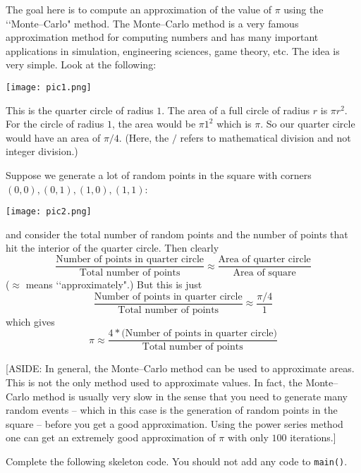 The goal here is to compute an approximation of the value of $\pi$ using the
\lq\lq Monte--Carlo" method. The Monte--Carlo method is a very famous
approximation method for computing numbers and has many important applications
in simulation, engineering sciences, game theory, etc. The idea is very simple.
Look at the following:
\begin{center}
\texttt{[image: pic1.png]}
\end{center}
This is the quarter circle of radius $1$. The area of a full circle of radius
$r$ is $\pi r^2$. For the circle of radius $1$, the area would be $\pi 1^2$
which is $\pi$. So our quarter circle would have an area of $\pi / 4$. (Here,
the $/$ refers to mathematical division and not integer division.)

Suppose we generate a lot of random points in the square with corners
$(0,0), (0,1), (1,0), (1,1)$:
\begin{center}
\texttt{[image: pic2.png]}
\end{center}

and consider the total number of random points and the number of points that
hit the interior of the quarter circle. Then clearly
\[
\frac{\text{Number of points in quarter circle}}
{\text{Total number of points}} 
\approx
\frac{\text{Area of quarter circle}}
{\text{Area of square}}
\]
($\approx$ means \lq\lq approximately".) But this is just
\[
\frac{\text{Number of points in quarter circle}}
{\text{Total number of points}}
\approx
\frac{\pi / 4}{1}
\]
which gives
\[
\pi
\approx
\frac{4 * \text{(Number of points in quarter circle)}}
{\text{Total number of points}}
\]

[ASIDE: In general, the Monte--Carlo method can be used to approximate areas.
This is not the only method used to approximate values. In fact, the
Monte--Carlo method is usually very slow in the sense that you need to
generate many random events -- which in this case is the generation of random
points in the square -- before you get a good approximation. Using the power
series method one can get an extremely good approximation of $\pi$ with only
$100$ iterations.]

Complete the following skeleton code. You should not add any code to
\verb!main()!.  

